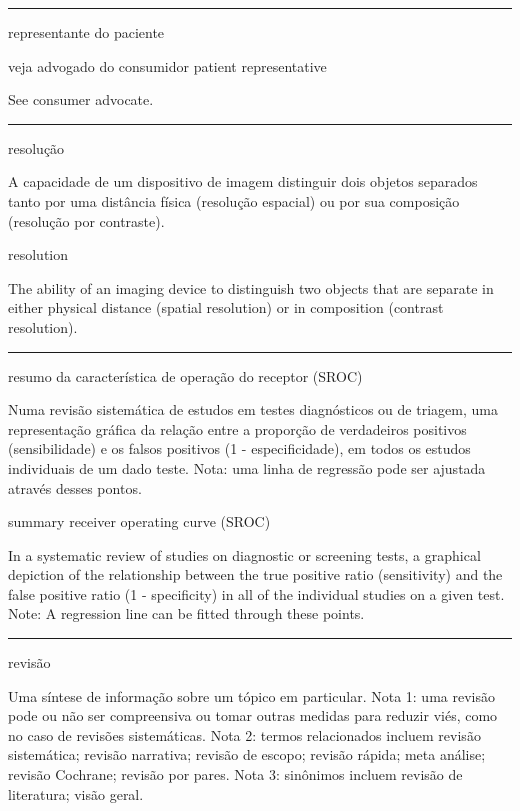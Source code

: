 \documentclass[
]{book}
\begin{document}
\begin{center}\rule{0.5\linewidth}{0.5pt}\end{center}

representante do paciente

veja advogado do consumidor
patient representative

See consumer advocate.

\begin{center}\rule{0.5\linewidth}{0.5pt}\end{center}

resolução

A capacidade de um dispositivo de imagem distinguir dois objetos separados tanto por uma distância física (resolução espacial) ou por sua composição (resolução por contraste).

resolution

The ability of an imaging device to distinguish two objects that are separate in either physical distance (spatial resolution) or in composition (contrast resolution).

\begin{center}\rule{0.5\linewidth}{0.5pt}\end{center}

resumo da característica de operação do receptor (SROC)

Numa revisão sistemática de estudos em testes diagnósticos ou de triagem, uma representação gráfica da relação entre a proporção de verdadeiros positivos (sensibilidade) e os falsos positivos (1 - especificidade), em todos os estudos individuais de um dado teste. Nota: uma linha de regressão pode ser ajustada através desses pontos.

summary receiver operating curve (SROC)

In a systematic review of studies on diagnostic or screening tests, a graphical depiction of the relationship between the true positive ratio (sensitivity) and the false positive ratio (1 - specificity) in all of the individual studies on a given test. Note: A regression line can be fitted through these points.

\begin{center}\rule{0.5\linewidth}{0.5pt}\end{center}

revisão

Uma síntese de informação sobre um tópico em particular. Nota 1: uma revisão pode ou não ser compreensiva ou tomar outras medidas para reduzir viés, como no caso de revisões sistemáticas. Nota 2: termos relacionados incluem revisão sistemática; revisão narrativa; revisão de escopo; revisão rápida; meta análise; revisão Cochrane; revisão por pares. Nota 3: sinônimos incluem revisão de literatura; visão geral.
\end{document}
